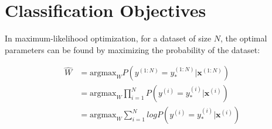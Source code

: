 \documentclass[12pt, letterpaper]{article}
\begin{document}
\section{Classification Objectives}

    In maximum-likelihood optimization, for a dataset of size $N$, the optimal parameters can be found by maximizing the probability of the dataset:
    
    \begin{align}
    \hat W &= \text{argmax}_W P(y^{(1:N)}=y^{(1:N)}_*|\mathbf{x}^{(1:N)}) \\
    &= \text{argmax}_W \prod_{i=1}^{N}P(y^{(i)}=y^{(i)}_*|\mathbf{x}^{(i)}) \\
    &= \text{argmax}_W \sum_{i=1}^{N}logP(y^{(i)}=y^{(i)}_*|\mathbf{x}^{(i)})
    \end{align}
    
\end{document}
